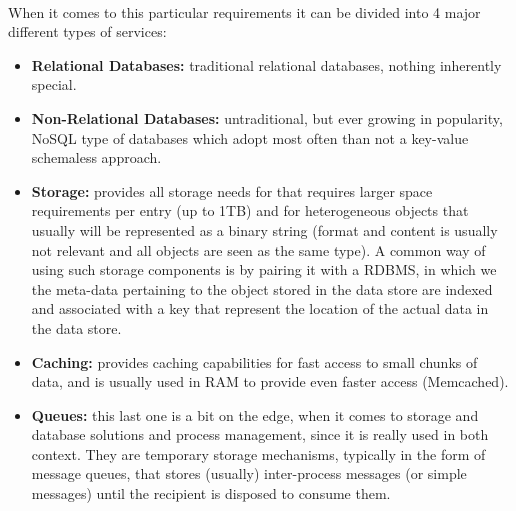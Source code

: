 \documentclass[11pt]{amsart}
\begin{document}
\begin{enumarate}
          \\ When it comes to this particular requirements it can be divided into 4 major
          different types of services: 
          \begin{itemize}
            \item \textbf{Relational Databases:} traditional relational databases, nothing
              inherently special.
            \item \textbf{Non-Relational Databases:} untraditional, but ever growing in
              popularity, NoSQL type of databases which adopt most often than not a
              key-value schemaless approach.
            \item \textbf{Storage:} provides all storage needs for that requires larger
              space requirements per entry (up to 1TB) and for heterogeneous objects that
              usually will be represented as a binary string (format and content is
              usually not relevant and all objects are seen as the same type). A common
              way of using such storage components is by pairing it with a RDBMS, in which
              we the meta-data pertaining to the object stored in the data store are
              indexed and associated with a key that represent the location of the actual
              data in the data store.  
            \item \textbf{Caching:} provides caching capabilities for fast access to small
              chunks of data, and is usually used in RAM to provide even faster access (Memcached).
            \item \textbf{Queues:} this last one is a bit on the edge, when it comes to
              storage and database solutions and process management, since it is really
              used in both context. They are temporary storage mechanisms, typically in
              the form of message queues, that stores (usually) inter-process messages (or
              simple messages) until the recipient is disposed to consume them.
          \end{itemize}
          

\end{enumarate}
\end{document}
